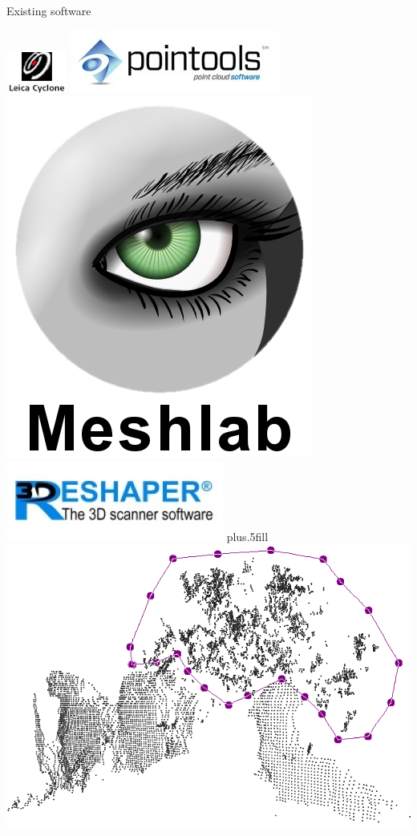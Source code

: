 \documentclass[compress]{beamer}
\begin{document}
\begin{frame}{Existing software}

\centering


\includegraphics[height=0.10\textheight]{pics/cyclone.jpg}
\includegraphics[height=0.10\textheight]{pics/pointools.jpg}
\includegraphics[height=0.10\textheight]{pics/meshlab.png}
\includegraphics[height=0.10\textheight]{pics/3dreshaper.jpg}
\vskip0pt plus.5fill
\includegraphics[height=0.40\textheight]{pics/lasso.png}

\end{frame}
\end{document}
